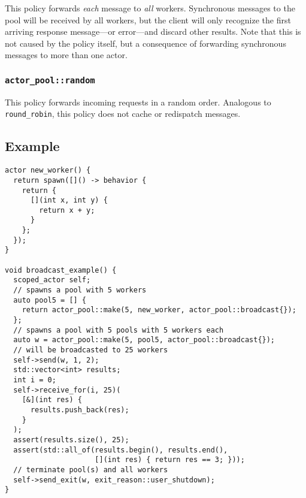 This policy forwards \emph{each} message to \emph{all} workers.
Synchronous messages to the pool will be received by all workers, but the client will only recognize the first arriving response message---or error---and discard other results.
Note that this is not caused by the policy itself, but a consequence of forwarding synchronous messages to more than one actor.

\subsubsection{\lstinline^actor_pool::random^}

This policy forwards incoming requests in a random order.
Analogous to \lstinline^round_robin^, this policy does not cache or redispatch messages.

\subsection{Example}

\begin{lstlisting}
actor new_worker() {
  return spawn([]() -> behavior {
    return {
      [](int x, int y) {
        return x + y;
      }
    };
  });
}

void broadcast_example() {
  scoped_actor self;
  // spawns a pool with 5 workers
  auto pool5 = [] {
    return actor_pool::make(5, new_worker, actor_pool::broadcast{});
  };
  // spawns a pool with 5 pools with 5 workers each
  auto w = actor_pool::make(5, pool5, actor_pool::broadcast{});
  // will be broadcasted to 25 workers
  self->send(w, 1, 2);
  std::vector<int> results;
  int i = 0;
  self->receive_for(i, 25)(
    [&](int res) {
      results.push_back(res);
    }
  );
  assert(results.size(), 25);
  assert(std::all_of(results.begin(), results.end(),
                     [](int res) { return res == 3; }));
  // terminate pool(s) and all workers
  self->send_exit(w, exit_reason::user_shutdown);
}
\end{lstlisting}
